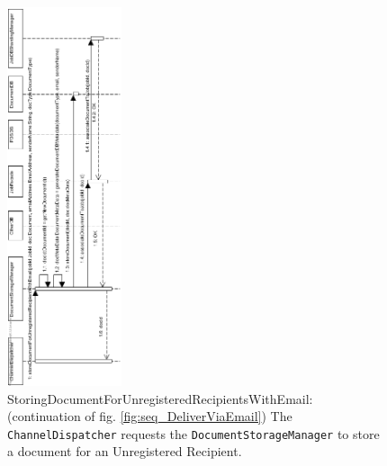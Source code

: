 \documentclass[a4paper,10pt]{article}
\begin{document}
\begin{figure}[!htp]
    \centering
    \includegraphics[width=0.3\textwidth]{StoringDocumentForUnregisteredRecipientsWithEmail.png}
    \caption{StoringDocumentForUnregisteredRecipientsWithEmail: (continuation of fig. \ref{fig:seq_DeliverViaEmail}) The \texttt{ChannelDispatcher} requests the \texttt{DocumentStorageManager} to store a document for an Unregistered Recipient.
        }\label{fig:seq_StoreDocumentForUnregisteredRecipient}
\end{figure}
\end{document}
